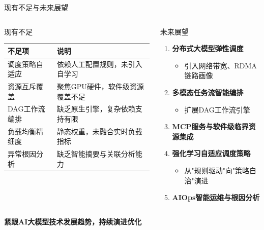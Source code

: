 \documentclass[aspectratio=169,UTF8,xcolor=table]{ctexbeamer}
\begin{document}
\begin{frame}{现有不足与未来展望}
  \begin{columns}[T]
    \begin{block}{现有不足}
      \begin{table}
        \footnotesize
        \begin{tabular}{|p{1.8cm}|p{2.6cm}|}
          \hline
          \rowcolor{ustcblue!30}
          \textbf{不足项} & \textbf{说明} \\
          \hline
          调度策略自适应 & 依赖人工配置规则，未引入自学习 \\
          \hline
          资源互斥覆盖 & 聚焦GPU硬件，软件级资源覆盖不足 \\
          \hline
          DAG工作流编排 & 缺乏原生引擎，复杂依赖支持有限 \\
          \hline
          负载均衡精细度 & 静态权重，未融合实时负载指标 \\
          \hline
          异常根因分析 & 缺乏智能摘要与关联分析能力 \\
          \hline
        \end{tabular}
      \end{table}
    \end{block}

    \begin{block}{未来展望}
      \begin{enumerate}
        \item \textbf{分布式大模型弹性调度}
        \begin{itemize}
          \item 引入网络带宽、RDMA链路画像
        \end{itemize}
        \item \textbf{多模态任务流智能编排}
        \begin{itemize}
          \item 扩展DAG工作流引擎
        \end{itemize}
        \item \textbf{MCP服务与软件级临界资源集成}
        \item \textbf{强化学习自适应调度策略}
        \begin{itemize}
          \item 从"规则驱动"向"策略自治"演进
        \end{itemize}
        \item \textbf{AIOps智能运维与根因分析}
      \end{enumerate}
    \end{block}
  \end{columns}

  \vspace{0.2cm}
  \begin{center}
    \textbf{紧跟AI大模型技术发展趋势，持续演进优化}
  \end{center}
\end{frame}
\end{document}
